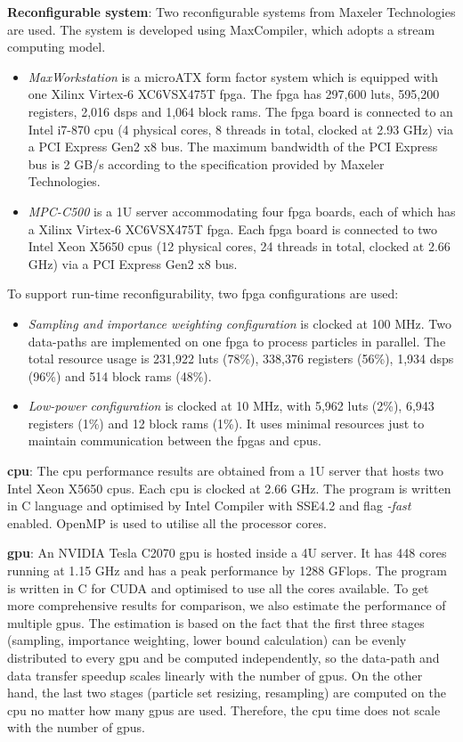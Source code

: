 \textbf{Reconfigurable system}: Two reconfigurable systems from Maxeler Technologies are used.
The system is developed using MaxCompiler, which adopts a stream computing model.
\begin{itemize}
\item \textit{MaxWorkstation} is a microATX form factor system which is equipped with one Xilinx Virtex-6 XC6VSX475T \gls{fpga}.
The \gls{fpga} has 297,600 \glspl{lut}, 595,200 registers, 2,016 \glspl{dsp} and 1,064 block \glspl{ram}. 
The \gls{fpga} board is connected to an Intel i7-870 \gls{cpu} (4 physical cores, 8 threads in total, clocked at 2.93 GHz) via a PCI Express Gen2 x8 bus.
The maximum bandwidth of the PCI Express bus is 2 GB/s according to the specification provided by Maxeler Technologies.
\item \textit{MPC-C500} is a 1U server accommodating four \gls{fpga} boards, each of which has a Xilinx Virtex-6 XC6VSX475T \gls{fpga}.
Each \gls{fpga} board is connected to two Intel Xeon X5650 \glspl{cpu} (12 physical cores, 24 threads in total, clocked at 2.66 GHz) via a PCI Express Gen2 x8 bus.
\end{itemize}

To support run-time reconfigurability, two \gls{fpga} configurations are used:
\begin{itemize}
\item {\it Sampling and importance weighting configuration} is clocked at 100 MHz.
Two data-paths are implemented on one \gls{fpga} to process particles in parallel.
The total resource usage is 231,922 \glspl{lut} (78\%), 338,376 registers (56\%), 1,934 \glspl{dsp} (96\%) and 514 block \glspl{ram} (48\%).
\item {\it Low-power configuration} is clocked at 10 MHz, with 5,962 \glspl{lut} (2\%), 6,943 registers (1\%) and 12 block \glspl{ram} (1\%).
It uses minimal resources just to maintain communication between the \glspl{fpga} and \glspl{cpu}.
\end{itemize}

\textbf{\gls{cpu}}: The \gls{cpu} performance results are obtained from a 1U server that hosts two Intel Xeon X5650 \glspl{cpu}. 
Each \gls{cpu} is clocked at 2.66 GHz.
The program is written in C language and optimised by Intel Compiler with SSE4.2 and flag {\it -fast} enabled.
OpenMP is used to utilise all the processor cores.

\textbf{\gls{gpu}}: An NVIDIA Tesla C2070 \gls{gpu} is hosted inside a 4U server.
It has 448 cores running at 1.15 GHz and has a peak performance by 1288 GFlops.
The program is written in C for CUDA and optimised to use all the cores available.
To get more comprehensive results for comparison, we also estimate the performance of multiple \gls{gpu}s.
The estimation is based on the fact that the first three stages (sampling, importance weighting, lower bound calculation) can be evenly distributed to every \gls{gpu} and be computed independently, 
so the data-path and data transfer speedup scales linearly with the number of \gls{gpu}s.
On the other hand, the last two stages (particle set resizing, resampling) are computed on the \gls{cpu} no matter how many \gls{gpu}s are used.
Therefore, the \gls{cpu} time does not scale with the number of \gls{gpu}s.

